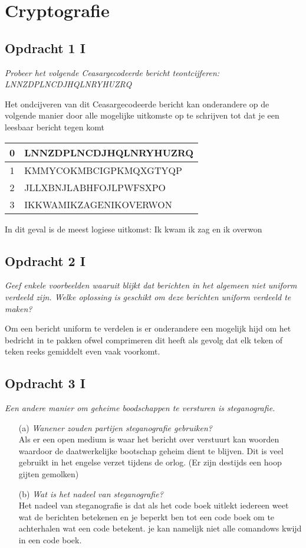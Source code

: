 \chapter{Cryptografie}

\section{Opdracht 1 I}
\emph{Probeer het volgende Ceasargecodeerde bericht teontcijferen:\\
LNNZDPLNCDJHQLNRYHUZRQ}

Het ondcijveren van dit Ceasargecodeerde bericht kan onderandere op de volgende manier door alle mogelijke uitkomste op te schrijven tot dat je een leesbaar bericht tegen komt

\begin{tabular}{|c|l|}
  \hline
  0 & LNNZDPLNCDJHQLNRYHUZRQ \\\hline
  1 & KMMYCOKMBCIGPKMQXGTYQP \\\hline
  2 & JLLXBNJLABHFOJLPWFSXPO \\\hline
  3 & IKKWAMIKZAGENIKOVERWON \\\hline
\end{tabular}

In dit geval is de meest logiese uitkomst: Ik kwam ik zag en ik overwon

\section{Opdracht 2 I}
\emph{Geef enkele voorbeelden waaruit blijkt dat berichten in het algemeen niet uniform verdeeld zijn. Welke oplossing is geschikt om deze berichten uniform verdeeld te maken?}

Om een bericht uniform te verdelen is er onderandere een mogelijk hijd om het bedricht in te pakken ofwel comprimeren dit heeft als gevolg dat elk teken of teken reeks gemiddelt even vaak voorkomt.

\section{Opdracht 3 I}
\emph{Een andere manier om geheime boodschappen te versturen is steganografie.}
\begin{itemize}
\item[(a)] \emph{Wanener zouden partijen steganografie gebruiken?} \\
  Als er een open medium is waar het bericht over verstuurt kan woorden waardoor de daatwerkelijke bootschap geheim dient te blijven. Dit is veel gebruikt in het engelse verzet tijdens de orlog. (Er zijn destijds een hoop gijten gemolken)
\item[(b)] \emph{Wat is het nadeel van steganografie?}\\
  Het nadeel van steganografie is dat als het code boek uitlekt iedereen weet wat de berichten betekenen en je beperkt ben tot een code boek om te achterhalen wat een code betekent. je kan namelijk niet alle comandows kwijd in een code boek.
\end{itemize}

